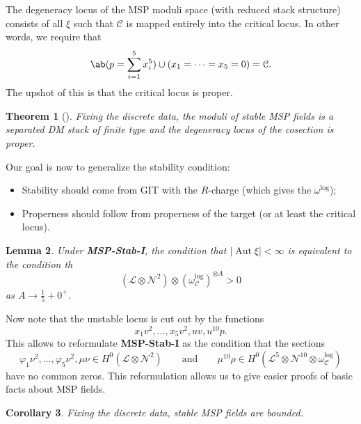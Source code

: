 \documentclass[10pt]{amsart}
\newtheorem{thm}{Theorem}[section]
\newtheorem{cor}[thm]{Corollary}
\newtheorem{lem}[thm]{Lemma}
\theoremstyle{definition}
\theoremstyle{remark}
\theoremstyle{plain}
\theoremstyle{definition}
\theoremstyle{remark}
\newcommand{\mc}[1]{\mathcal{#1}}
\newcommand{\1}{\mathbf{1}}
\newcommand{\2}{\mathbf{2}}
\newcommand{\3}{\mathbf{3}}
\DeclareMathOperator{\Aut}{Aut}
\begin{document}
The degeneracy locus of the MSP moduli space (with reduced stack structure) consists of all $\xi$ such that $\mc{C}$ is mapped entirely into the critical locus. In other words, we require that
\[ \ab(p = \sum_{i=1}^5 x_i^5) \cup (x_1 = \cdots = x_5 = 0) = \mc{C}. \]
The upshot of this is that the critical locus is proper.

\begin{thm}[\cite{mspfermat}]
    Fixing the discrete data, the moduli of stable MSP fields is a separated DM stack of finite type and the degeneracy locus of the cosection is proper.
\end{thm}

Our goal is now to generalize the stability condition:
\begin{itemize}
    \item Stability should come from GIT with the $R$-charge (which gives the $\omega^{\log}$);
    \item Properness should follow from properness of the target (or at least the critical locus).
\end{itemize}

\begin{lem}
        Under \textbf{MSP-Stab-I}, the condition that $|\Aut \xi|<\infty$ is equivalent to the condition th
        \[ (\mc{L} \otimes \mc{N}^2) \otimes ( \omega_{\mc{C}}^{\log} )^{\otimes A} > 0 \]
        as $A \to \frac{1}{5} + 0^+$.
\end{lem}

Now note that the unstable locus is cut out by the functions
\[ x_1 v^2, \ldots, x_5 v^2, uv, u^{10}p. \]
This allows to reformulate \textbf{MSP-Stab-I} as the condition that the sections
\[ \varphi_1 \nu^2, \ldots, \varphi_5 \nu^2, \mu\nu \in H^0(\mc{L} \otimes \mc{N}^2) \qquad \text{and} \qquad \mu^{10}\rho \in H^0(\mc{L}^5 \otimes \mc{N}^{10}\otimes \omega_{\mc{C}}^{\log}) \]
have no common zeros. This reformulation allows us to give easier proofs of basic facts about MSP fields.

\begin{cor}
    Fixing the discrete data, stable MSP fields are bounded.
\end{cor}
\end{document}
